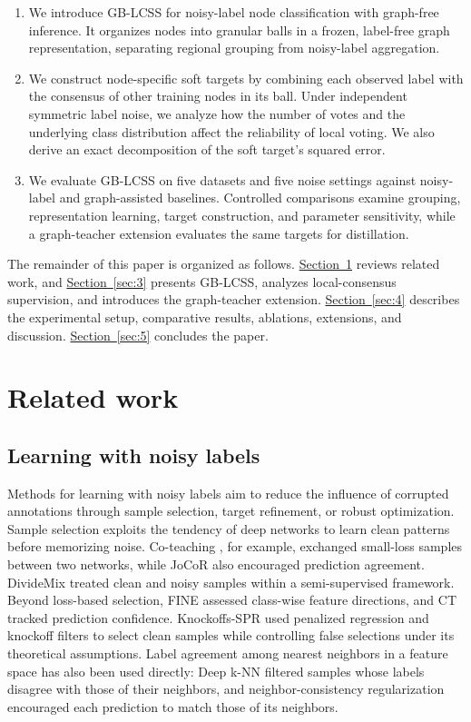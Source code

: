 \documentclass[10pt,letterpaper,nopreprintline]{elsarticle}
\theoremstyle{plain}
\begin{document}
\begin{enumerate}[label=(\arabic*)]
\item We introduce GB-LCSS for noisy-label node classification with graph-free inference. It organizes nodes into granular balls in a frozen, label-free graph representation, separating regional grouping from noisy-label aggregation.
\item We construct node-specific soft targets by combining each observed label with the consensus of other training nodes in its ball. Under independent symmetric label noise, we analyze how the number of votes and the underlying class distribution affect the reliability of local voting. We also derive an exact decomposition of the soft target's squared error.
\item We evaluate GB-LCSS on five datasets and five noise settings against noisy-label and graph-assisted baselines. Controlled comparisons examine grouping, representation learning, target construction, and parameter sensitivity, while a graph-teacher extension evaluates the same targets for distillation.
\end{enumerate}

The remainder of this paper is organized as follows. \hyperref[sec:2]{Section~\ref*{sec:2}} reviews related work, and \hyperref[sec:3]{Section~\ref*{sec:3}} presents GB-LCSS, analyzes local-consensus supervision, and introduces the graph-teacher extension. \hyperref[sec:4]{Section~\ref*{sec:4}} describes the experimental setup, comparative results, ablations, extensions, and discussion. \hyperref[sec:5]{Section~\ref*{sec:5}} concludes the paper.

\section{Related work}\label{sec:2}

\subsection{Learning with noisy labels}\label{sec:2.1}

Methods for learning with noisy labels aim to reduce the influence of corrupted annotations through sample selection, target refinement, or robust optimization. Sample selection exploits the tendency of deep networks to learn clean patterns before memorizing noise. Co-teaching \cite{ref17}, for example, exchanged small-loss samples between two networks, while JoCoR \cite{ref18} also encouraged prediction agreement. DivideMix \cite{ref19} treated clean and noisy samples within a semi-supervised framework. Beyond loss-based selection, FINE \cite{ref20} assessed class-wise feature directions, and CT \cite{ref21} tracked prediction confidence. Knockoffs-SPR \cite{ref22} used penalized regression and knockoff filters to select clean samples while controlling false selections under its theoretical assumptions. Label agreement among nearest neighbors in a feature space has also been used directly: Deep k-NN \cite{ref11} filtered samples whose labels disagree with those of their neighbors, and neighbor-consistency regularization \cite{ref10} encouraged each prediction to match those of its neighbors.
\end{document}
